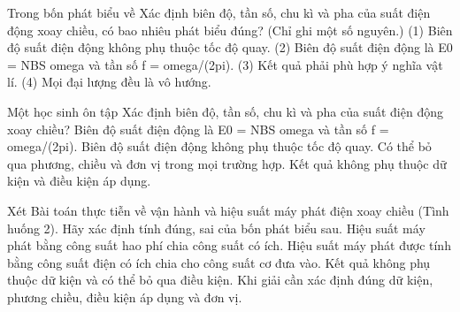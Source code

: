 \begin{ex}
Trong bốn phát biểu về Xác định biên độ, tần số, chu kì và pha của suất điện động xoay chiều, có bao nhiêu phát biểu đúng? (Chỉ ghi một số nguyên.) (1) Biên độ suất điện động không phụ thuộc tốc độ quay. (2) Biên độ suất điện động là E0 = NBS omega và tần số f = omega/(2pi). (3) Kết quả phải phù hợp ý nghĩa vật lí. (4) Mọi đại lượng đều là vô hướng.
\end{ex}

\begin{ex}
Một học sinh ôn tập Xác định biên độ, tần số, chu kì và pha của suất điện động xoay chiều?
\choice
{\True Biên độ suất điện động là E0 = NBS omega và tần số f = omega/(2pi).}
{Biên độ suất điện động không phụ thuộc tốc độ quay.}
{Có thể bỏ qua phương, chiều và đơn vị trong mọi trường hợp.}
{Kết quả không phụ thuộc dữ kiện và điều kiện áp dụng.}
\end{ex}

\begin{ex}
Xét Bài toán thực tiễn về vận hành và hiệu suất máy phát điện xoay chiều (Tình huống 2). Hãy xác định tính đúng, sai của bốn phát biểu sau.
\choiceTF
{Hiệu suất máy phát bằng công suất hao phí chia công suất có ích.}
{\True Hiệu suất máy phát được tính bằng công suất điện có ích chia cho công suất cơ đưa vào.}
{Kết quả không phụ thuộc dữ kiện và có thể bỏ qua điều kiện.}
{\True Khi giải cần xác định đúng dữ kiện, phương chiều, điều kiện áp dụng và đơn vị.}
\end{ex}

